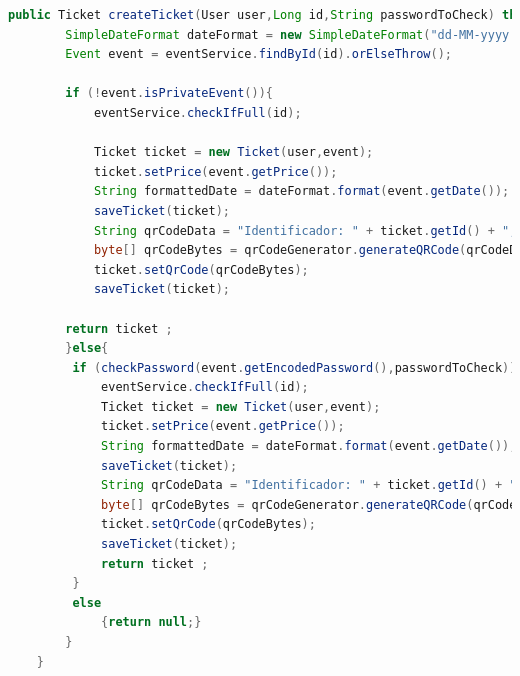 \myjavastyle
\begin{lstlisting}[language=Java, caption=Función createTicket, label=lst:servicioTicket]
    public Ticket createTicket(User user,Long id,String passwordToCheck) throws IOException, WriterException {
        SimpleDateFormat dateFormat = new SimpleDateFormat("dd-MM-yyyy HH:mm");
        Event event = eventService.findById(id).orElseThrow();

        if (!event.isPrivateEvent()){
            eventService.checkIfFull(id);

            Ticket ticket = new Ticket(user,event);
            ticket.setPrice(event.getPrice());
            String formattedDate = dateFormat.format(event.getDate());
            saveTicket(ticket);
            String qrCodeData = "Identificador: " + ticket.getId() + ", Nombre del Evento: " + event.getName() + ", Fecha del evento: "+ formattedDate;
            byte[] qrCodeBytes = qrCodeGenerator.generateQRCode(qrCodeData, 200, 200);
            ticket.setQrCode(qrCodeBytes);
            saveTicket(ticket);

        return ticket ;
        }else{
         if (checkPassword(event.getEncodedPassword(),passwordToCheck)){
             eventService.checkIfFull(id);
             Ticket ticket = new Ticket(user,event);
             ticket.setPrice(event.getPrice());
             String formattedDate = dateFormat.format(event.getDate());
             saveTicket(ticket);
             String qrCodeData = "Identificador: " + ticket.getId() + ", Nombre del Evento: " + event.getName() + ", Fecha del evento: "+ formattedDate;
             byte[] qrCodeBytes = qrCodeGenerator.generateQRCode(qrCodeData, 200, 200); // Ajusta el tamaño del QR según tus necesidades
             ticket.setQrCode(qrCodeBytes);
             saveTicket(ticket);
             return ticket ;
         }
         else
             {return null;}
        }
    }
\end{lstlisting}

